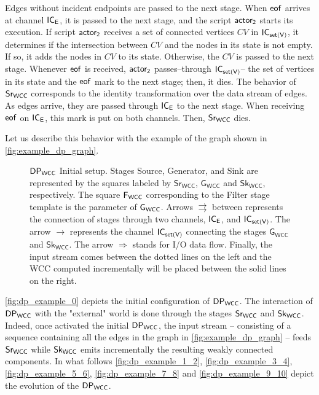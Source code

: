 Edges without incident endpoints are passed to the next stage. When $\mathsf{eof}$ arrives at channel $\mathsf{IC_E}$, it is passed to the next stage, and the script $\mathsf{actor_2}$ starts its execution. 
If script $\mathsf{actor_2}$ receives a set of connected vertices $CV$ in $\mathsf{IC_{set(V)}}$, it determines if the intersection between $CV$ and the nodes in its state is not empty. If so, it adds the nodes in $CV$  to its state. 
Otherwise, the $CV$ is passed to the next stage.  Whenever $\mathsf{eof}$ is received, $\mathsf{actor_2}$ passes--through $\mathsf{IC_{set(V)}}$-- the set of vertices in its state and the $\mathsf{eof}$ mark to the next stage; then, it dies.
The behavior of $\mathsf{Sr_{WCC}}$ corresponds to the identity transformation over the data stream of edges.  As edges arrive, they are passed through  $\mathsf{IC_E}$ to the next stage. When receiving $\mathsf{eof}$ on $\mathsf{IC_E}$, this mark is put on both channels. 
Then, $\mathsf{Sr_{WCC}}$ dies. 

Let us describe this behavior with the example of the graph shown in \autoref{fig:example_dp_graph}.

\begin{figure}[h!]
  \centering
{}
\caption[{[PoC] $\dpwcc$ Initial Setup}]{$\dpwcc$ Initial setup. Stages Source, Generator, and Sink are represented by the squares labeled by $\mathsf{Sr_{WCC}}$, $\mathsf{G_{WCC}}$ and $\mathsf{Sk_{WCC}}$, respectively.  The square $\mathsf{F_{WCC}}$ corresponding to the Filter stage template is the parameter of $\mathsf{G_{WCC}}$. Arrows $\rightrightarrows$ between represents the connection of stages through two channels, $\mathsf{IC_E}$, and $\mathsf{IC_{set(V)}}$. The arrow  $\rightarrow$ represents the channel $\mathsf{IC_{set(V)}}$ connecting the stages $\mathsf{G_{WCC}}$ and $\mathsf{Sk_{WCC}}$. The arrow $\Longrightarrow$ stands for I/O data flow. Finally, the input stream comes between the dotted lines on the left and the WCC computed incrementally will be placed between the solid lines on the right.}
\label{fig:dp_example_0}
\end{figure}

\autoref{fig:dp_example_0} depicts the initial configuration of $\dpwcc$. 
The interaction of $\dpwcc$ with the "external" world is done through the stages $\mathsf{Sr_{WCC}}$ and $\mathsf{Sk_{WCC}}$. 
Indeed, once activated the initial $\dpwcc$, the input stream -- consisting of a sequence containing all the edges in the graph in \autoref{fig:example_dp_graph} -- feeds $\mathsf{Sr_{WCC}}$ while  $\mathsf{Sk_{WCC}}$ emits incrementally the resulting weakly connected components.  
In what follows \autoref{fig:dp_example_1_2}, \autoref{fig:dp_example_3_4}, \autoref{fig:dp_example_5_6}, \autoref{fig:dp_example_7_8} and \autoref{fig:dp_example_9_10} depict the evolution of the $\dpwcc$.
 
